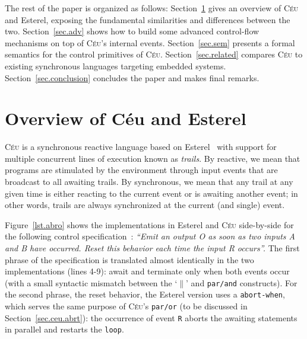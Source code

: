 \documentclass{acm_proc_article-sp}
\newcommand{\CEU}{\textsc{C\'{e}u}\xspace}
\newcommand{\code}[1] {{\small{\texttt{#1}}}}
\newcommand{\1}{\;}
\newcommand{\2}{\;\;}
\newcommand{\3}{\;\;\;}
\newcommand{\5}{\;\;\;\;\;}
\begin{document}
The rest of the paper is organized as follows:
Section~\ref{sec.ceu} gives an overview of \CEU and Esterel, exposing the 
fundamental similarities and differences between the two.
Section~\ref{sec.adv} shows how to build some advanced control-flow mechanisms 
on top of \CEU's internal events.
Section~\ref{sec.sem} presents a formal semantics for the control primitives of 
\CEU.
Section~\ref{sec.related} compares \CEU to existing synchronous languages 
targeting embedded systems.
Section~\ref{sec.conclusion} concludes the paper and makes final remarks.

\newpage %
\section{Overview of C\'eu and Esterel}
\label{sec.ceu}

\CEU is a synchronous reactive language based on Esterel~\cite{esterel.ieee91} 
with support for multiple concurrent lines of execution known as \emph{trails}.
By reactive, we mean that programs are stimulated by the environment through 
input events that are broadcast to all awaiting trails.
By synchronous, we mean that any trail at any given time is either reacting to 
the current event or is awaiting another event;
in other words, trails are always synchronized at the current (and single) 
event.

Figure~\ref{lst.abro} shows the implementations in Esterel and \CEU 
side-by-side for the following control specification~\cite{esterel.primer}:
%
\emph{``Emit an output O as soon as two inputs A and B have occurred.
Reset this behavior each time the input R occurs''.}
%
The first phrase of the specification is translated almost identically in the 
two implementations (lines 4-9): await and terminate only when both events 
occur (with a small syntactic mismatch between the `$\|$' and \code{par/and} 
constructs).
%
For the second phrase, the reset behavior, the Esterel version uses a 
\code{abort-when}, which serves the same purpose of \CEU's \code{par/or} (to be 
discussed in Section~\ref{sec.ceu.abrt}):
the occurrence of event \code{R} aborts the awaiting statements in parallel and 
restarts the \code{loop}.
\end{document}
